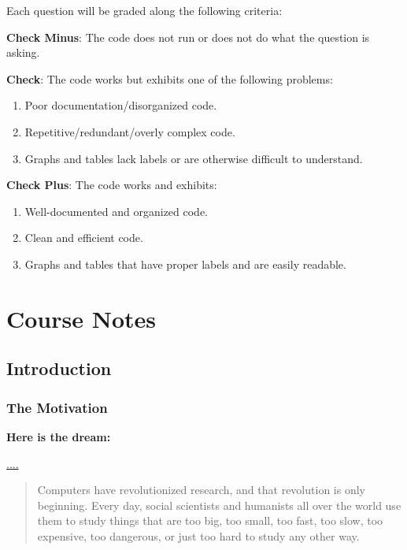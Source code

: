 \documentclass[]{book}
\providecommand{\tightlist}{%
  \setlength{\itemsep}{0pt}\setlength{\parskip}{0pt}}
\begin{document}
Each question will be graded along the following criteria:

\textbf{Check Minus}: The code does not run or does not do what the
question is asking.

\textbf{Check}: The code works but exhibits one of the following
problems:

\begin{enumerate}
\def\labelenumi{\arabic{enumi})}
\tightlist
\item
  Poor documentation/disorganized code.
\item
  Repetitive/redundant/overly complex code.
\item
  Graphs and tables lack labels or are otherwise difficult to
  understand.
\end{enumerate}

\textbf{Check Plus}: The code works and exhibits:

\begin{enumerate}
\def\labelenumi{\arabic{enumi})}
\tightlist
\item
  Well-documented and organized code.
\item
  Clean and efficient code.
\item
  Graphs and tables that have proper labels and are easily readable.
\end{enumerate}

\part{Course Notes}\label{part-course-notes}

\chapter{Introduction}\label{introduction}

\section{The Motivation}\label{the-motivation}

\textbf{Here is the dream:}

\url{....}

\begin{quote}
Computers have revolutionized research, and that revolution is only
beginning. Every day, social scientists and humanists all over the world
use them to study things that are too big, too small, too fast, too
slow, too expensive, too dangerous, or just too hard to study any other
way.
\end{quote}
\end{document}

